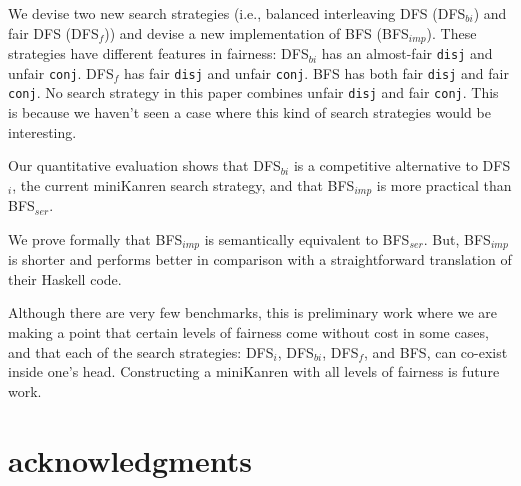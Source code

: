 \documentclass[format=acmlarge, review=false, authordraft=false]{acmart}
\newcommand{\conj}{\texttt{conj}}
\newcommand{\disj}{\texttt{disj}}
\newcommand{\DFSi }[0]{DFS$_{i}$}
\newcommand{\DFSf }[0]{DFS$_{f}$}
\newcommand{\DFSbi}[0]{DFS$_{bi}$}
\newcommand{\BFS}[0]{BFS}
\newcommand{\BFSser}[0]{BFS$_{ser}$}
\newcommand{\BFSimp}[0]{BFS$_{imp}$}
\begin{document}
We devise two new search strategies (i.e., balanced interleaving DFS 
(\DFSbi{}) and fair DFS (\DFSf{})) and devise a new 
implementation of \BFS{} (\BFSimp{}). These strategies have different features 
in fairness: \DFSbi{} has an almost-fair \disj{} and unfair \conj{}. 
\DFSf{} has fair \disj{} and unfair \conj{}. \BFS{} has both fair
\disj{} and fair \conj{}. No search strategy in this paper combines unfair 
\disj{} and fair \conj{}. This is because we haven't seen a case where this 
kind of search strategies would be interesting.

Our quantitative evaluation shows that \DFSbi{} is a competitive 
alternative to \DFSi{}, the current miniKanren search strategy,
and that \BFSimp{} is more practical than \BFSser{}.

We prove formally that \BFSimp{} is semantically equivalent to \BFSser{}. But, 
\BFSimp{} is shorter and performs better in comparison with a straightforward 
translation of their Haskell code.

Although there are very few benchmarks, this is preliminary work where we are 
making a point that certain levels of fairness come without cost in some cases, 
and that each of the search strategies: \DFSi, \DFSbi, \DFSf, and 
\BFS, can co-exist inside one's head. Constructing a miniKanren with all 
levels of fairness is future work.

\section*{acknowledgments}



\end{document}
